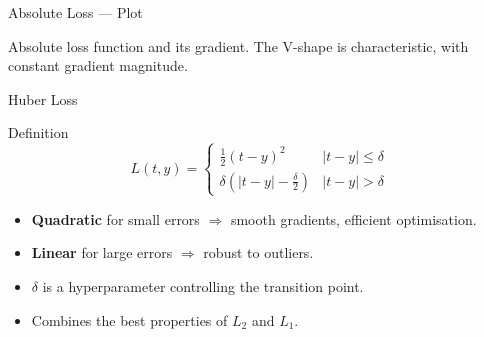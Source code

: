 \begin{frame}{Absolute Loss — Plot}
  \begin{center}
  \end{center}
  \small Absolute loss function and its gradient. The V-shape is characteristic, with constant gradient magnitude.
\end{frame}

\begin{frame}{Huber Loss}
  \begin{block}{Definition}
    \[
      L(t,y) = \begin{cases}
        \tfrac{1}{2}(t-y)^2 & |t-y|\leq\delta\\[4pt]
        \delta\!\left(|t-y|-\tfrac{\delta}{2}\right) & |t-y|>\delta
      \end{cases}
    \]
  \end{block}
  \begin{itemize}
    \item \textbf{Quadratic} for small errors $\Rightarrow$ smooth gradients, efficient optimisation.
    \item \textbf{Linear} for large errors $\Rightarrow$ robust to outliers.
    \item $\delta$ is a hyperparameter controlling the transition point.
    \item Combines the best properties of $L_2$ and $L_1$.
  \end{itemize}
\end{frame}

